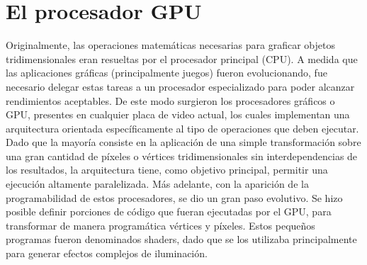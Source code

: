 \documentclass[a4paper,10pt]{report}
\begin{document}
\section{El procesador GPU}



% 


% 
% 

Originalmente, las operaciones matemáticas necesarias para graficar objetos tridimensionales eran resueltas por el procesador principal (CPU). 
A medida que las aplicaciones gráficas (principalmente juegos) fueron evolucionando, fue necesario delegar estas tareas a un procesador especializado para poder
alcanzar rendimientos aceptables. De este modo surgieron los procesadores gráficos o GPU, presentes en cualquier placa de video actual, los cuales implementan una arquitectura orientada específicamente al tipo de operaciones que deben ejecutar. 
Dado que la mayoría consiste en la aplicación de una simple transformación sobre una gran cantidad de píxeles o vértices tridimensionales sin interdependencias de los resultados, 
la arquitectura tiene, como objetivo principal, permitir una ejecución altamente paralelizada.
Más adelante, con la aparición de la programabilidad de estos procesadores, se dio un gran paso evolutivo. 
Se hizo posible definir porciones de código que fueran ejecutadas por el GPU, para transformar de manera programática vértices y píxeles. 
Estos pequeños programas fueron denominados shaders, dado que se los utilizaba principalmente para generar efectos complejos de iluminación. 
\end{document}
